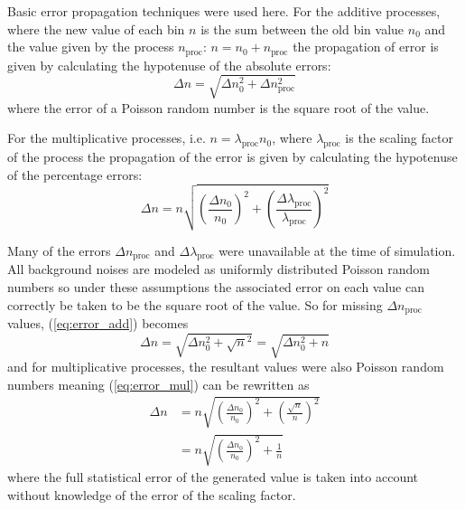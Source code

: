 Basic error propagation techniques were used here. For the additive processes,
where the new value of each bin $n$ is the sum between the old bin value $n_0$
and the value given by the process $n_\text{proc}$: $n=n_0+n_\text{proc}$ the
propagation of error is given by calculating the hypotenuse of the absolute
errors:
\begin{equation}
	\Delta n= \sqrt{\Delta n_0^2 + \Delta n_\text{proc}^2}
	\label{eq:error_add}
\end{equation}
where the error of a Poisson random number is the square root of the value.

For the multiplicative processes, i.e. $n = \lambda_\text{proc}n_0$, where
$\lambda_\text{proc}$ is the scaling factor of the process the propagation of
the error is given by calculating the hypotenuse of the percentage errors:
\begin{equation}
	\Delta n= n \sqrt{
		\left( \frac{\Delta n_0}{n_0} \right)^2 +
		\left( \frac{\Delta \lambda_\text{proc}}{\lambda_\text{proc}} \right)^2}
	\label{eq:error_mul}
\end{equation}

Many of the errors \(\Delta n_\text{proc}\) and \(\Delta \lambda_\text{proc}\)
were unavailable at the time of simulation. All background noises are modeled as
uniformly distributed Poisson random numbers so under these assumptions the
associated error on each value can correctly be taken to be the square root of
the value. %
So for missing \(\Delta n_\text{proc}\) values, (\ref{eq:error_add}) becomes
\begin{equation}
	\Delta n= \sqrt{\Delta n_0^2 + \sqrt{n}^2} = \sqrt{\Delta n_0^2 + n}
\end{equation}
and for multiplicative processes, the resultant values were also Poisson random
numbers meaning (\ref{eq:error_mul}) can be rewritten as
\begin{equation}
	\begin{split}
		\Delta n &=
		n \sqrt{
			\left( \frac{\Delta n_0}{n_0} \right)^2 +
			\left( \frac{\sqrt{n}}{n} \right)^2
		} \\[1em]
		&= n \sqrt{
			\left( \frac{\Delta n_0}{n_0} \right)^2 +
			\frac{1}{n}
		}
	\end{split}
\end{equation}
where the full statistical error of the generated value is taken into account
without knowledge of the error of the scaling factor.

